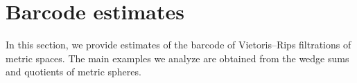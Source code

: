 
\section{Barcode estimates}\label{s:barcodes}

In this section, we provide estimates of the barcode of Vietoris--Rips filtrations of metric spaces.
The main examples we analyze are obtained from the wedge sums and quotients of metric spheres.




